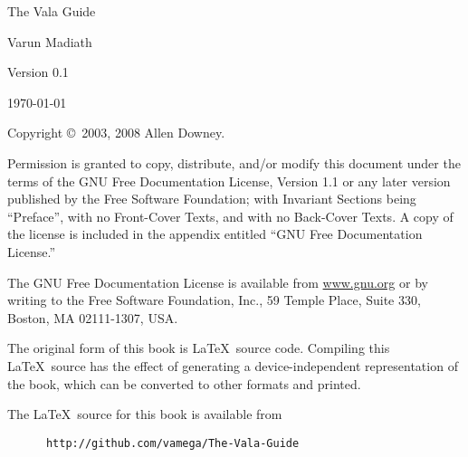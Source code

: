 \documentclass[openany]{book}
\begin{document}
\renewcommand{\theFancyVerbLine}{
  \bfseries\ttfamily\textcolor[RGB]{32,32,32}{\scriptsize\arabic{FancyVerbLine}}}


\pagebreak
\thispagestyle{empty}

\begin{flushright}
\vspace*{2.5in}

{\huge The Vala Guide}

\vspace{1in}

{\Large
Varun Madiath
}


\vspace{1in}

{\Large Version 0.1}

{\small \today}

\vfill

\end{flushright}

\pagebreak
\thispagestyle{empty}

Copyright \copyright ~2003, 2008 Allen Downey.

\vspace{0.25in}

Permission is granted to copy, distribute, and/or modify this document
under the terms of the GNU Free Documentation License, Version 1.1 or
any later version published by the Free Software Foundation; with
Invariant Sections being ``Preface'', with no Front-Cover Texts, and
with no Back-Cover Texts.  A copy of the license is included in the
appendix entitled ``GNU Free Documentation License.''

The GNU Free Documentation License is available from \url{www.gnu.org}
or by writing to the Free Software Foundation, Inc., 59 Temple Place,
Suite 330, Boston, MA 02111-1307, USA.

The original form of this book is \LaTeX\ source code.  Compiling this
\LaTeX\ source has the effect of generating a device-independent
representation of the book, which can be converted to other formats
and printed.

The \LaTeX\ source for this book is available from

\begin{verbatim}
      http://github.com/vamega/The-Vala-Guide
\end{verbatim}
\end{document}
